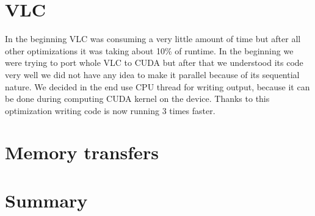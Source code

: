 \documentclass[11pt]{article}
\begin{document}
\section{VLC}
In the beginning VLC was consuming a very little amount of time but after all other optimizations it was taking about 10\% of runtime. In the beginning we were trying to port whole VLC to CUDA but after that we understood its code very well we did not have any idea to make it parallel because of its sequential nature. We decided in the end use CPU thread for writing output, because it can be done during computing CUDA kernel on the device. Thanks to this optimization writing code is now running 3 times faster.
\section{Memory transfers}

\section{Summary}
\end{document}
